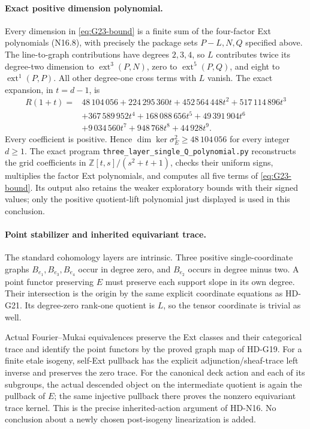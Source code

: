 \paragraph{Exact positive dimension polynomial.}
Every dimension in \eqref{eq:G23-bound} is a finite sum of the
four-factor Ext polynomials (N16.8), with precisely the package
sets \(P-L,N,Q\) specified above. The line-to-graph contributions
have degrees \(2,3,4\), so \(L\) contributes twice its degree-two
dimension to \(\operatorname{ext}^3(P,N)\), zero to
\(\operatorname{ext}^5(P,Q)\), and eight to
\(\operatorname{ext}^1(P,P)\). All other degree-one cross terms
with \(L\) vanish. The exact expansion, in \(t=d-1\), is
\begin{align*}
 R(1+t)={}&48\,104\,056+224\,295\,360t+452\,564\,448t^2
                      +517\,114\,896t^3\\
 &+367\,589\,952t^4+168\,088\,656t^5+49\,391\,904t^6\\
 &+9\,034\,560t^7+948\,768t^8+44\,928t^9.
\end{align*}
Every coefficient is positive. Hence
\(\dim\ker\sigma_E^2\ge48\,104\,056\) for every integer
\(d\ge1\). The exact program
\texttt{three\_layer\_single\_Q\_}\allowbreak\texttt{polynomial.py}
reconstructs the grid coefficients in \(\mathbb Z[t,s]/(s^2+t+1)\),
checks their uniform signs, multiplies the factor Ext polynomials,
and computes all five terms of \eqref{eq:G23-bound}. Its output
also retains the weaker exploratory bounds with their signed values;
only the positive quotient-lift polynomial just displayed is used
in this conclusion.

\paragraph{Point stabilizer and inherited equivariant trace.}
The standard cohomology layers are intrinsic. Three positive
single-coordinate graphs \(B_{e_1},B_{e_3},B_{e_4}\) occur in
degree zero, and \(B_{e_2}\) occurs in degree minus two. A point
functor preserving \(E\) must preserve each support slope in its
own degree. Their intersection is the origin by the same explicit
coordinate equations as HD-G21. Its degree-zero rank-one quotient
is \(L\), so the tensor coordinate is trivial as well.

Actual Fourier--Mukai equivalences preserve the Ext classes and
their categorical trace and identify the point functors by the
proved graph map of HD-G19. For a finite etale isogeny, self-Ext
pullback has the explicit adjunction/sheaf-trace left inverse and
preserves the zero trace. For the canonical deck action and each
of its subgroups, the actual descended object on the intermediate
quotient is again the pullback of \(E\); the same injective pullback
there proves the nonzero equivariant trace kernel. This is the
precise inherited-action argument of HD-N16. No conclusion about
a newly chosen post-isogeny linearization is added.

